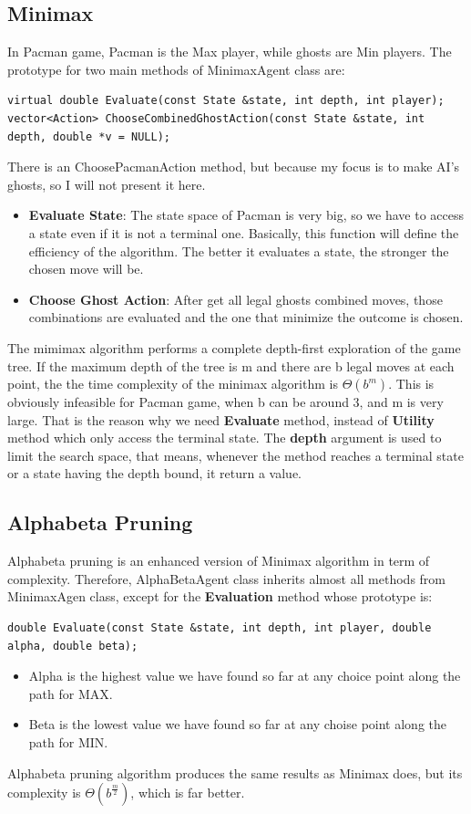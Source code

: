 \documentclass[a4paper, 11pt]{article}
\begin{document}
\subsection{Minimax}
In Pacman game, Pacman is the Max player, while ghosts are Min players. The prototype for two main methods of MinimaxAgent class are: 
\begin{lstlisting}
virtual double Evaluate(const State &state, int depth, int player);
vector<Action> ChooseCombinedGhostAction(const State &state, int depth, double *v = NULL);
\end{lstlisting}
There is an ChoosePacmanAction method, but because my focus is to make AI's ghosts, so I will not present it here.
\begin{itemize}
\item \textbf{Evaluate State}: The state space of Pacman is very big, so we have to access a state even if it is not a terminal one. Basically, this function will define the efficiency of the algorithm. The better it evaluates a state, the stronger the chosen move will be.
\item \textbf{Choose Ghost Action}: After get all legal ghosts combined moves, those combinations are evaluated and the one that minimize the outcome is chosen. 
\end{itemize}
The mimimax algorithm performs a complete depth-first exploration of the game tree. If the maximum depth of the tree is m and there are b legal moves at each point, the the time complexity of the minimax algorithm is $\Theta (b^m)$. This is obviously infeasible for Pacman game, when b can be around 3, and m is very large. That is the reason why we need \textbf{Evaluate} method, instead of \textbf{Utility} method which only access the terminal state. The \textbf{depth} argument is used to limit the search space, that means, whenever the method reaches a terminal state or a state having the depth bound, it return a value.
\subsection{Alphabeta Pruning}
Alphabeta pruning is an enhanced version of Minimax algorithm in term of complexity. Therefore, AlphaBetaAgent class inherits almost all methods from MinimaxAgen class, except for the \textbf{Evaluation} method whose prototype is:
\begin{lstlisting}
double Evaluate(const State &state, int depth, int player, double alpha, double beta);
\end{lstlisting}
\begin{itemize}
\item Alpha is the highest value  we have found so far at any choice point along the path for MAX.
\item Beta is the lowest value we have found so far at any choise point along the path for MIN.
\end{itemize}
Alphabeta pruning algorithm produces the same results as Minimax does, but its complexity is $\Theta (b^{\frac{m}{2}})$, which is far better.
\end{document}
